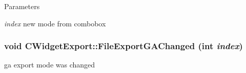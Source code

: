 \begin{DoxyParams}{Parameters}
\item[{\em index}]new mode from combobox \end{DoxyParams}
\hypertarget{classCWidgetExport_a791cea634360998bf2e12584ce533bd7}{
\subsubsection[{FileExportGAChanged}]{\setlength{\rightskip}{0pt plus 5cm}void CWidgetExport::FileExportGAChanged (int {\em index})}}
\label{classCWidgetExport_a791cea634360998bf2e12584ce533bd7}
ga export mode was changed



